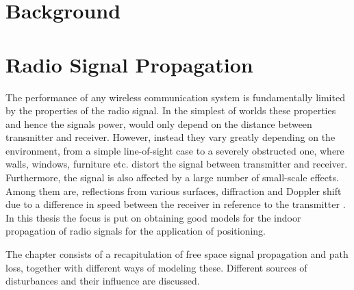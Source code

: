 \documentclass{LTHthesis}
\begin{document}
\chapter{Background}

\chapter{Radio Signal Propagation}
%
\label{chap:RSP}
%
The performance of any wireless communication system is fundamentally limited by the properties of the radio signal. In the simplest of worlds these properties and hence the signals power, would only depend on the distance between transmitter and receiver. However, instead they vary greatly depending on the environment, from a simple line-of-sight case to a severely obstructed one, where walls, windows, furniture etc. distort the signal between transmitter and receiver. Furthermore, the signal is also affected by a large number of small-scale effects. Among them are, reflections from various surfaces, diffraction and Doppler shift due to a difference in speed between the receiver in reference to the transmitter \cite{rappaport96}. In this thesis the focus is put on obtaining good models for the indoor propagation of radio signals for the application of positioning. 

The chapter consists of a recapitulation of free space signal propagation and path loss, together with different ways of modeling these. Different sources of disturbances and their influence are discussed. 
%
\end{document}
